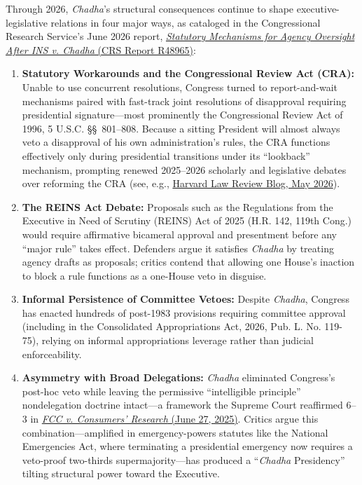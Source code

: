 \documentclass[12pt]{article}
\begin{document}
Through 2026, \textit{Chadha}'s structural consequences continue to shape executive-legislative relations in four major ways, as cataloged in the Congressional Research Service's June 2026 report, \href{https://www.everycrsreport.com/reports/R48965.html}{\textit{Statutory Mechanisms for Agency Oversight After INS v. Chadha} (CRS Report R48965)}:
\begin{enumerate}
  \item \textbf{Statutory Workarounds and the Congressional Review Act (CRA):} Unable to use concurrent resolutions, Congress turned to report-and-wait mechanisms paired with fast-track joint resolutions of disapproval requiring presidential signature---most prominently the Congressional Review Act of 1996, 5 U.S.C. \S\S~801--808. Because a sitting President will almost always veto a disapproval of his own administration's rules, the CRA functions effectively only during presidential transitions under its ``lookback'' mechanism, prompting renewed 2025--2026 scholarly and legislative debates over reforming the CRA (see, e.g., \href{https://harvardlawreview.org/blog/2026/05/from-destruction-to-construction-the-case-for-a-new-congressional-review-act/}{Harvard Law Review Blog, May 2026}).
  \item \textbf{The REINS Act Debate:} Proposals such as the Regulations from the Executive in Need of Scrutiny (REINS) Act of 2025 (H.R. 142, 119th Cong.) would require affirmative bicameral approval and presentment before any ``major rule'' takes effect. Defenders argue it satisfies \textit{Chadha} by treating agency drafts as proposals; critics contend that allowing one House's inaction to block a rule functions as a one-House veto in disguise.
  \item \textbf{Informal Persistence of Committee Vetoes:} Despite \textit{Chadha}, Congress has enacted hundreds of post-1983 provisions requiring committee approval (including in the Consolidated Appropriations Act, 2026, Pub. L. No. 119-75), relying on informal appropriations leverage rather than judicial enforceability.
  \item \textbf{Asymmetry with Broad Delegations:} \textit{Chadha} eliminated Congress's post-hoc veto while leaving the permissive ``intelligible principle'' nondelegation doctrine intact---a framework the Supreme Court reaffirmed 6--3 in \href{https://ballotpedia.org/Federal_Communications_Commission_v._Consumers%E2%80%99_Research}{\textit{FCC v. Consumers' Research} (June 27, 2025)}. Critics argue this combination---amplified in emergency-powers statutes like the National Emergencies Act, where terminating a presidential emergency now requires a veto-proof two-thirds supermajority---has produced a ``\textit{Chadha} Presidency'' tilting structural power toward the Executive.
\end{enumerate}
\end{document}
